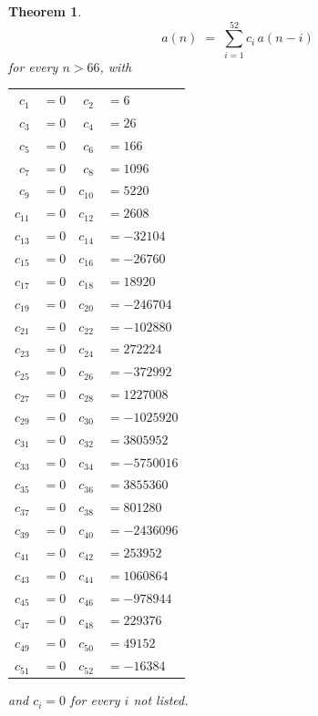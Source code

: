 \documentclass[11pt,a4paper]{article}
\theoremstyle{plain}
\newtheorem{theorem}{Theorem}
\theoremstyle{definition}
\begin{document}
\begin{theorem}
\[
a(n)\;=\;\sum_{i=1}^{52}c_i\,a(n-i)
\]
for every $n>66$, with
\begin{center}\footnotesize
\begin{tabular}{r@{\,}l@{\qquad}r@{\,}l}
$c_{1}$ & $=0$ & $c_{2}$ & $=6$ \\
$c_{3}$ & $=0$ & $c_{4}$ & $=26$ \\
$c_{5}$ & $=0$ & $c_{6}$ & $=166$ \\
$c_{7}$ & $=0$ & $c_{8}$ & $=1096$ \\
$c_{9}$ & $=0$ & $c_{10}$ & $=5220$ \\
$c_{11}$ & $=0$ & $c_{12}$ & $=2608$ \\
$c_{13}$ & $=0$ & $c_{14}$ & $=-32104$ \\
$c_{15}$ & $=0$ & $c_{16}$ & $=-26760$ \\
$c_{17}$ & $=0$ & $c_{18}$ & $=18920$ \\
$c_{19}$ & $=0$ & $c_{20}$ & $=-246704$ \\
$c_{21}$ & $=0$ & $c_{22}$ & $=-102880$ \\
$c_{23}$ & $=0$ & $c_{24}$ & $=272224$ \\
$c_{25}$ & $=0$ & $c_{26}$ & $=-372992$ \\
$c_{27}$ & $=0$ & $c_{28}$ & $=1227008$ \\
$c_{29}$ & $=0$ & $c_{30}$ & $=-1025920$ \\
$c_{31}$ & $=0$ & $c_{32}$ & $=3805952$ \\
$c_{33}$ & $=0$ & $c_{34}$ & $=-5750016$ \\
$c_{35}$ & $=0$ & $c_{36}$ & $=3855360$ \\
$c_{37}$ & $=0$ & $c_{38}$ & $=801280$ \\
$c_{39}$ & $=0$ & $c_{40}$ & $=-2436096$ \\
$c_{41}$ & $=0$ & $c_{42}$ & $=253952$ \\
$c_{43}$ & $=0$ & $c_{44}$ & $=1060864$ \\
$c_{45}$ & $=0$ & $c_{46}$ & $=-978944$ \\
$c_{47}$ & $=0$ & $c_{48}$ & $=229376$ \\
$c_{49}$ & $=0$ & $c_{50}$ & $=49152$ \\
$c_{51}$ & $=0$ & $c_{52}$ & $=-16384$ \\
\end{tabular}
\end{center}
and $c_i=0$ for every $i$ not listed.
\end{theorem}
\end{document}
